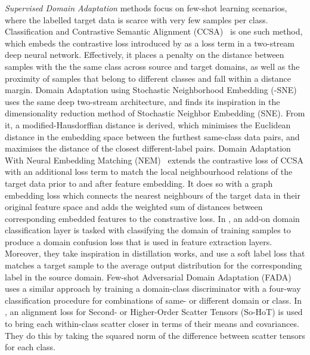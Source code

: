 \documentclass[journal]{IEEEtran}
\begin{document}
\textit{Supervised Domain Adaptation} methods focus on few-shot learning scenarios, where the labelled target data is scarce with very few samples per class. 
Classification and Contrastive Semantic Alignment (CCSA)~\cite{motiian2017ccsa} is one such method, which embeds the contrastive loss introduced by \citet{hadsell2006dimensionality} as a loss term in a two-stream deep neural network. Effectively, it places a penalty on the distance between samples with the the same class across source and target domains, as well as the proximity of samples that belong to different classes and fall within a distance margin.
Domain Adaptation using Stochastic Neighborhood Embedding (-SNE)~\cite{xu2019dsne} uses the same deep two-stream architecture, and finds its inspiration in the dimensionality reduction method of Stochastic Neighbor Embedding (SNE). From it, a modified-Hausdorffian distance is derived, which minimises the Euclidean distance in the embedding space between the furthest same-class data pairs, and maximises the distance of the closest different-label pairs.
Domain Adaptation With Neural Embedding Matching (NEM)~\cite{wang2019nem} extends the contrastive loss of CCSA with an additional loss term to match the local neighbourhood relations of the target data prior to and after feature embedding. It does so with a graph embedding loss which connects the nearest neighbours of the target data in their original feature space and adds the weighted sum of distances between corresponding embedded features to the constrastive loss.
In \cite{tzeng2015simultaneous}, an add-on domain classification layer is tasked with classifying the domain of training samples to produce a domain confusion loss that is used in feature extraction layers. Moreover, they take inspiration in distillation works, and use a soft label loss that matches a target sample to the average output distribution for the corresponding label in the source domain.
Few-shot Adversarial Domain Adaptation (FADA)~\cite{motiian2017fada} uses a similar approach by training a domain-class discriminator with a four-way classification procedure for combinations of same- or different domain or class.
In \cite{koniusz2017domain}, an alignment loss for Second- or Higher-Order Scatter Tensors (So-HoT) is used to bring each within-class scatter closer in terms of their means and covariances. They do this by taking the squared norm of the difference between scatter tensors for each class.
\end{document}
